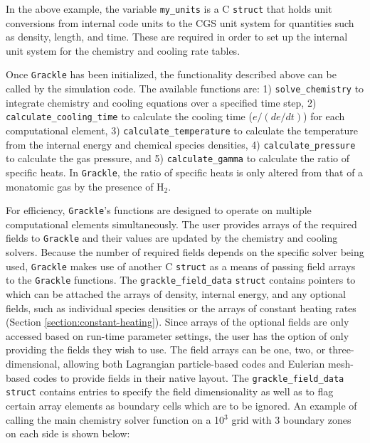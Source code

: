 In the above example, the variable \texttt{my\_units} is a C
\texttt{struct} that holds unit conversions from internal code units
to the CGS unit system for quantities such as density, length, and
time.  These are required in order to set up the internal unit system
for the chemistry and cooling rate tables.

Once \texttt{Grackle} has been initialized, the functionality described
above can be called by the simulation code.  The available functions
are: 1) \texttt{solve\_chemistry} to integrate chemistry and cooling
equations over a specified time step, 2)
\texttt{calculate\_cooling\_time} to calculate the cooling time
($e/(de/dt)$) for each computational element, 3)
\texttt{calculate\_temperature} to calculate the temperature from the
internal energy and chemical species densities, 4)
\texttt{calculate\_pressure} to calculate the gas pressure, and 5)
\texttt{calculate\_gamma} to calculate the ratio of specific heats.
In \texttt{Grackle}, the ratio of specific heats is only altered from that
of a monatomic gas by the presence of H$_{2}$.

For efficiency, \texttt{Grackle}'s functions are designed to operate on
multiple computational elements simultaneously.  The user provides
arrays of the required fields to \texttt{Grackle} and their values are
updated by the chemistry and cooling solvers.  Because the number of
required fields depends on the specific solver being used, \texttt{Grackle}
makes use of another C \texttt{struct} as a means of passing field
arrays to the \texttt{Grackle} functions.  The \texttt{grackle\_field\_data}
\texttt{struct} contains pointers to which can be attached the arrays
of density, internal energy, and any optional fields, such as
individual species densities or the arrays of constant heating rates
(Section \ref{section:constant-heating}).  Since arrays of the
optional fields are only accessed based on run-time parameter
settings, the user has the option of only providing the fields they
wish to use.  The field arrays can be one, two, or three-dimensional,
allowing both Lagrangian particle-based codes and Eulerian mesh-based
codes to provide fields in their native layout.  The
\texttt{grackle\_field\_data} \texttt{struct} contains entries to
specify the field dimensionality as well as to flag certain array
elements as boundary cells which are to be ignored.  An example of
calling the main chemistry solver function on a 10$^{3}$ grid with 3
boundary zones on each side is shown below:

